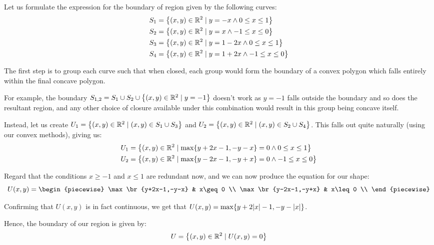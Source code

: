 \begin{example}
    Let us formulate the expression for the boundary of region given by the following curves:
    \begin{align*}
        S_1 &= \br*{(x,y)\in\mathbb{R}^2\mid y=-x\land 0\leq x\leq 1} \\
        S_2 &= \br*{(x,y)\in\mathbb{R}^2\mid y=x\land -1\leq x\leq 0} \\
        S_3 &= \br*{(x,y)\in\mathbb{R}^2\mid y=1-2x\land 0\leq x\leq 1} \\
        S_4 &= \br*{(x,y)\in\mathbb{R}^2\mid y=1+2x\land -1\leq x\leq 0}
    \end{align*}

    The first step is to group each curve such that when closed, each group would form the boundary of a convex polygon which falls entirely within the final concave polygon.

    For example, the boundary $S_{1,2}=S_1\cup S_2\cup \br*{(x,y)\in\mathbb{R}^2\mid y=-1}$ doesn't work as $y=-1$ falls outside the boundary and so does the resultant region, and any other choice of closure available under this combination would result in this group being concave itself.

    Instead, let us create $U_1=\br*{(x,y)\in\mathbb{R}^2\mid (x,y)\in S_1\cup S_3}$ and $U_2=\br*{(x,y)\in\mathbb{R}^2\mid (x,y)\in S_2\cup S_4}$. This falls out quite naturally (using our convex methods), giving us:
    \begin{align*}
        U_1 &= \br*{(x,y)\in\mathbb{R}^2\mid \max\br{y+2x-1,-y-x}=0\land 0\leq x\leq 1} \\
        U_2 &= \br*{(x,y)\in\mathbb{R}^2\mid \max\br{y-2x-1,-y+x}=0\land -1\leq x\leq 0}
    \end{align*}

    Regard that the conditions $x\geq -1$ and $x\leq 1$ are redundant now, and we can now produce the equation for our shape:
    $$
        U(x,y) = \begin{piecewise}
            \max\br{y+2x-1,-y-x} & x\geq 0 \\
            \max\br{y-2x-1,-y+x} & x\leq 0 \\
        \end{piecewise}
    $$

    Confirming that $U(x,y)$ is in fact continuous, we get that $U(x,y)=\max\br{y+2\abs{x}-1,-y-\abs{x}}$.

    Hence, the boundary of our region is given by:
    $$
        U = \br*{(x,y)\in\mathbb{R}^2\mid U(x,y)=0}
    $$
\end{example}


